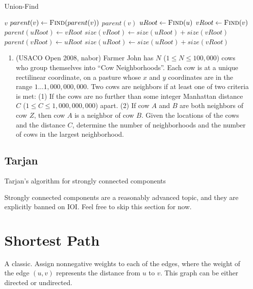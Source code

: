 \documentclass[11pt]{book}
\begin{document}
\begin{algorithm}[H]
\caption{Union-Find}
\begin{algorithmic}
		\State \Return $v$
    \EndIf
    \State $parent(v) \gets \Call{Find}{parent(v)}$
    \State \Return $parent(v)$
\EndFunction
{}
	\State $uRoot \gets \Call{Find}{u}$
	\State $vRoot \gets \Call{Find}{v}$
		\State \Return
	\EndIf
    	\State $parent(uRoot) \gets vRoot$
        \State $size(vRoot) \gets size(uRoot) + size(vRoot)$
    \Else
    	\State $parent(vRoot) \gets uRoot$
        \State $size(uRoot) \gets size(uRoot) + size(vRoot)$
    \EndIf
\EndFunction
\end{algorithmic}
\end{algorithm}

\begin{enumerate}
\item
(USACO Open 2008, nabor)
Farmer John has $N$ ($1 \le N 
\le 100,000$) cows who group themselves into ``Cow
Neighborhoods''. Each cow is at a unique rectilinear coordinate, on a pasture whose $x$ and $y$ coordinates are
in the range $1\ldots1,000,000,000$. Two cows are neighbors if at least one of two criteria is met: (1) If the cows are
no further than some integer Manhattan distance $C$ ($1 \le C \le 1,000,000,000$) apart. (2) If cow $A$ and $B$ are
both neighbors of cow $Z$, then cow $A$ is a neighbor of cow $B$. Given the locations of the cows and the distance
$C$, determine the number of neighborhoods and the number of cows in the largest neighborhood.
\end{enumerate}

\subsection{Tarjan}

Tarjan's algorithm for strongly connected components

Strongly connected components are a reasonably advanced topic, and they are explicitly banned on IOI. Feel free to skip this section for now.

\section{Shortest Path}

A classic. Assign nonnegative weights to each of the edges, where the weight of the edge $(u,v)$ represents the distance from $u$ to $v$. This graph can be either directed or undirected.
\end{document}
